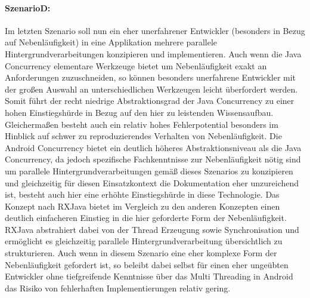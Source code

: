 \documentclass[12pt,oneside,a4paper,bibtotoc,liststotoc]{scrreprt}
\begin{document}
\paragraph{SzenarioD:}
Im letzten Szenario soll nun ein eher unerfahrener Entwickler (besonders in Bezug auf Nebenläufigkeit) in eine Applikation mehrere parallele Hintergrundverarbeitungen konzipieren und implementieren. Auch wenn die Java Concurrency elementare Werkzeuge bietet um Nebenläufigkeit exakt an Anforderungen zuzuschneiden, so können besonders unerfahrene Entwickler mit der großen Auswahl an unterschiedlichen Werkzeugen leicht überfordert werden.  Somit führt der recht niedrige Abstraktionsgrad der Java Concurrency zu einer hohen Einstiegshürde in Bezug auf den hier zu leistenden Wissensaufbau. Gleichermaßen besteht auch ein relativ hohes Fehlerpotential besonders im Hinblick auf schwer zu reproduzierendes Verhalten von Nebenläufigkeit.
Die Android Concurrency bietet ein deutlich höheres Abstraktionsniveau als die Java Concurrency, da jedoch spezifische Fachkenntnisse zur Nebenläufigkeit nötig sind um parallele Hintergrundverarbeitungen gemäß dieses Szenarios zu konzipieren und gleichzeitig für diesen Einsatzkontext die Dokumentation eher unzureichend ist, besteht auch hier eine erhöhte Einstiegshürde in diese Technologie.
Das Konzept nach RXJava bietet im Vergleich zu den anderen Konzepten einen deutlich einfacheren Einstieg in die hier geforderte Form der Nebenläufigkeit. RXJava abstrahiert dabei von der Thread Erzeugung sowie Synchronisation und ermöglicht es gleichzeitig parallele Hintergrundverarbeitung übersichtlich zu strukturieren. Auch wenn in diesem Szenario eine eher komplexe Form der Nebenläufigkeit gefordert ist, so beleibt dabei selbst für einen eher ungeübten Entwickler ohne tiefgreifende Kenntnisse über das Multi Threading in Android das Risiko von fehlerhaften Implementierungen relativ gering.\newline
\end{document}
